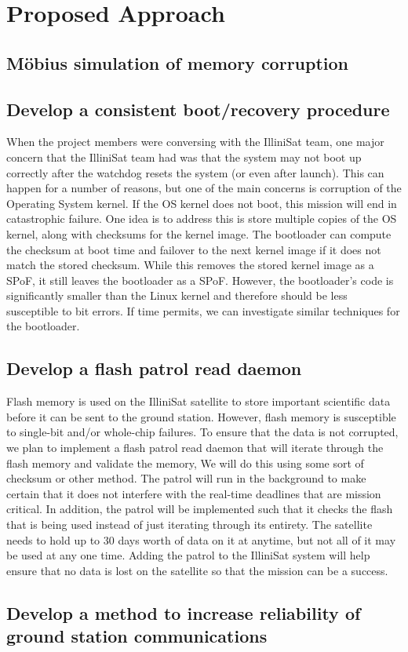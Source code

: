 \section{Proposed Approach}
\subsection{M\"obius simulation of memory corruption}

\subsection{Develop a consistent boot/recovery procedure}
When the project members were conversing with the IlliniSat team, one major
concern that the IlliniSat team had was that the system may not boot up
correctly after the watchdog resets the system (or even after launch).  This can
happen for a number of reasons, but one of the main concerns is corruption of
the Operating System kernel.  If the OS kernel does not boot, this mission will
end in catastrophic failure.  One idea is to address this is store multiple
copies of the OS kernel, along with checksums for the kernel image.  The
bootloader can compute the checksum at boot time and failover to the next kernel
image if it does not match the stored checksum.  While this removes the stored
kernel image as a SPoF, it still leaves the bootloader as a SPoF.  However, the
bootloader's code is significantly smaller than the Linux kernel and therefore
should be less susceptible to bit errors.  If time permits, we can investigate
similar techniques for the bootloader. 

\subsection{Develop a flash patrol read daemon}
Flash memory is used on the IlliniSat satellite to store important scientific data before it can be sent to the ground station. However, flash memory is susceptible to single-bit and/or whole-chip failures. To ensure that the data is not corrupted, we plan to implement a flash patrol read daemon that will iterate through the flash memory and validate the memory, We will do this using some sort of checksum or other method. The patrol will run in the background to make certain that it does not interfere with the real-time deadlines that are mission critical. In addition, the patrol will be implemented such that it checks the flash that is being used instead of just iterating through its entirety. The satellite needs to hold up to 30 days worth of data on it at anytime, but not all of it may be used at any one time. Adding the patrol to the IlliniSat system will help ensure that no data is lost on the satellite so that the mission can be a success. 

\subsection{Develop a method to increase reliability of ground station
communications}

